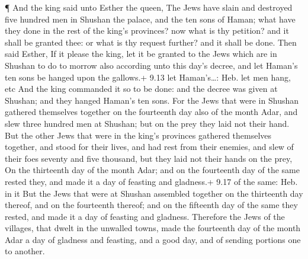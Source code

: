  ¶ And the king said unto Esther the queen, The Jews have
slain and destroyed five hundred men in Shushan the palace, and the ten
sons of Haman; what have they done in the rest of the king's provinces?
now what is thy petition? and it shall be granted thee: or what is thy
request further? and it shall be done.  Then said Esther,
If it please the king, let it be granted to the Jews which are in
Shushan to do to morrow also according unto this day's decree, and let
Haman's ten sons be hanged upon the gallows.+ 9.13 let Haman's\ldots:
Heb. let men hang, etc  And the king commanded it so to be
done: and the decree was given at Shushan; and they hanged Haman's ten
sons.  For the Jews that were in Shushan gathered
themselves together on the fourteenth day also of the month Adar, and
slew three hundred men at Shushan; but on the prey they laid not their
hand.  But the other Jews that were in the king's provinces
gathered themselves together, and stood for their lives, and had rest
from their enemies, and slew of their foes seventy and five thousand,
but they laid not their hands on the prey,  On the
thirteenth day of the month Adar; and on the fourteenth day of the same
rested they, and made it a day of feasting and gladness.+ 9.17 of the
same: Heb. in it  But the Jews that were at Shushan
assembled together on the thirteenth day thereof, and on the fourteenth
thereof; and on the fifteenth day of the same they rested, and made it a
day of feasting and gladness.  Therefore the Jews of the
villages, that dwelt in the unwalled towns, made the fourteenth day of
the month Adar a day of gladness and feasting, and a good day, and of
sending portions one to another.

